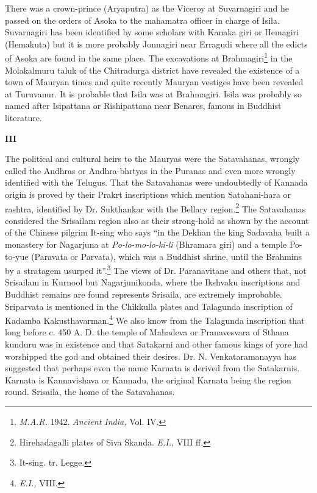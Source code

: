 \documentclass{book}
\begin{document}
There was a crown-prince (Aryaputra) as the Viceroy at Suvarnagiri and he passed on the orders of Asoka to the mahamatra officer in charge of Isila. Suvarnagiri has been identified by some scholars with Kanaka giri or Hemagiri (Hemakuta) but it is more probably Jonnagiri near Erragudi where all the edicts of Asoka are found in the same place. The excavations at Brahmagiri\footnote[5]{{\em M.A.R.} 1942. {\em Ancient India,} Vol. IV.} in the Molakalmuru taluk of the Chitradurga district have revealed the existence of a town of Mauryan times and quite recently Mauryan vestiges have been revealed at Turuvanur. It is probable that Isila was at Brahmagiri. Isila was probably so named after Isipattana or Rishipattana near Benares, famous in Buddhist literature.

\medskip
\begin{center}
{\bf III}
\end{center}
\smallskip

The political and cultural heirs to the Mauryas were the Satavahanas, wrongly called the Andhras or Andhra-bhrtyas in the Puranas and even more wrongly identified with the Telugus. That the Satavahanas were undoubtedly of Kannada origin is proved by their Prakrt inscriptions which mention Satahani-hara or rashtra, identified by Dr. Sukthankar with the Bellary region.\footnote[6]{Hirehadagalli plates of Siva Skanda. {\em E.I.,} VIII ff.} The Satavahanas considered the Srisailam region also as their strong-hold as shown by the account of the Chinese pilgrim It-sing who says ``in the Dekhan the king Sadavaha built a monastery for Nagarjuna at {\em Po-lo-mo-lo-ki-li} (Bhramara giri) and a temple Po-to-yue (Paravata or Parvata), which was a Buddhist shrine, until the Brahmins by a stratagem usurped it''.\footnote[7]{It-sing. tr. Legge.} The views of Dr. Paranavitane and others that, not Srisailam in Kurnool but Nagarjunikonda, where the Ikshvaku inscriptions and Buddhist remains are found represents Srisaila, are extremely improbable. Sriparvata is mentioned in the Chikkulla plates and Talagunda inscription of Kadamba Kakusthavarman.\footnote[8]{{\em E.I.,} VIII.} We also know from the Talagunda inscription that long before c. 450 A. D. the temple of Mahadeva or Pranavesvara of Sthana kunduru was in existence and that Satakarni and other famous kings of yore had worshipped the god and obtained their desires. Dr. N. Venkataramanayya has suggested that perhaps even the name Karnata is derived from the Satakarnis. Karnata is Kannavishava or Kannadu, the original Karnata being the region round. Srisaila, the home of the Satavahanas.
\end{document}
